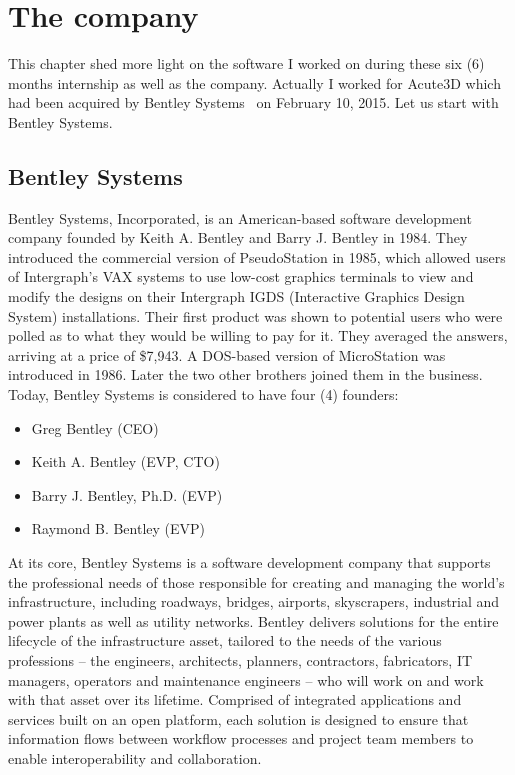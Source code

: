 \chapter{The company}
\label{ch:company}

This chapter shed more light on the software I worked on during these six (6) months internship as well as the company. Actually I worked for Acute3D which had been acquired by Bentley Systems~\cite{acute} on February 10, 2015. Let us start with Bentley Systems.


\section{Bentley Systems}
Bentley Systems, Incorporated, is an American-based software development company founded by Keith A. Bentley and Barry J. Bentley in 1984. They introduced the commercial version of PseudoStation in 1985, which allowed users of Intergraph's VAX systems to use low-cost graphics terminals to view and modify the designs on their Intergraph IGDS (Interactive Graphics Design System) installations. Their first product was shown to potential users who were polled as to what they would be willing to pay for it. They averaged the answers, arriving at a price of
\$7,943. A DOS-based version of MicroStation was introduced in 1986. Later the two other brothers joined them in the business. Today, Bentley Systems is considered to have four (4) founders:
\begin{itemize}
\item Greg Bentley (CEO)
\item Keith A. Bentley (EVP, CTO)
\item Barry J. Bentley, Ph.D. (EVP)
\item Raymond B. Bentley (EVP)
\end{itemize}

At its core, Bentley Systems is a software development company that supports the professional needs of those responsible for creating and managing the world’s infrastructure, including roadways, bridges, airports, skyscrapers, industrial and power plants as well as utility networks.  Bentley delivers solutions for the entire lifecycle of the infrastructure asset, tailored to the needs of the various professions -- the engineers, architects, planners, contractors, fabricators, IT managers,
 operators and maintenance engineers -- who will work on and work with that asset over its lifetime. Comprised of integrated applications and services built on an open platform, each solution is designed to ensure that information flows between workflow processes and project team members to enable interoperability and collaboration.

